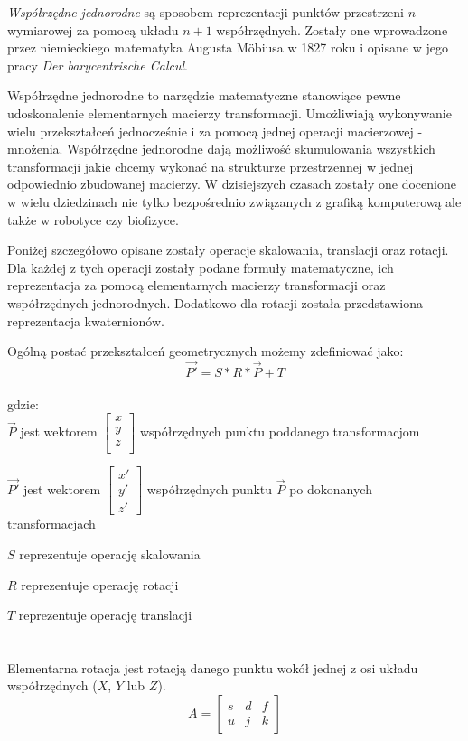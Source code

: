 \documentclass[licencjacka]{pracamgr}
\begin{document}
\textit{Współrzędne jednorodne} są sposobem reprezentacji punktów przestrzeni $n$-wymiarowej za pomocą układu $n+1$ współrzędnych. Zostały one wprowadzone przez niemieckiego matematyka Augusta Möbiusa w 1827 roku i opisane w jego pracy \textit{Der barycentrische Calcul}. 

Współrzędne jednorodne to narzędzie matematyczne stanowiące pewne udoskonalenie elementarnych macierzy transformacji. Umożliwiają wykonywanie wielu przekształceń jednocześnie i za pomocą jednej operacji macierzowej - mnożenia. Współrzędne jednorodne dają możliwość skumulowania wszystkich transformacji jakie chcemy wykonać na strukturze przestrzennej w jednej odpowiednio zbudowanej macierzy. W dzisiejszych czasach zostały one docenione w wielu dziedzinach nie tylko bezpośrednio związanych z grafiką komputerową ale także w robotyce czy biofizyce.

Poniżej szczegółowo opisane zostały operacje skalowania, translacji oraz rotacji. Dla każdej z tych operacji zostały podane formuły matematyczne, ich reprezentacja za pomocą elementarnych macierzy transformacji oraz współrzędnych jednorodnych. Dodatkowo dla rotacji została przedstawiona reprezentacja kwaternionów.

\iffalse
Ogólną postać przekształceń geometrycznych możemy zdefiniować jako:
$$
\vec{P'}=S*R*\vec{P}+T
$$
\\
gdzie:
\\

$\vec{P}$ jest wektorem $\begin{bmatrix} x \\y \\z \\ \end{bmatrix}$ współrzędnych punktu poddanego transformacjom

$\vec{P'}$ jest wektorem $\begin{bmatrix} x'\\ y'\\ z' \end{bmatrix} $ współrzędnych punktu $\vec{P}$ po dokonanych transformacjach

$S$ reprezentuje operację skalowania

$R$ reprezentuje operację rotacji

$T$ reprezentuje operację translacji
\\
\\
\\
Elementarna rotacja jest rotacją danego punktu wokół jednej z osi układu współrzędnych ($X$, $Y$ lub $Z$).
$$
A=\begin{bmatrix}
s & d & f \\
u & j & k
\end{bmatrix}
$$
\end{document}
